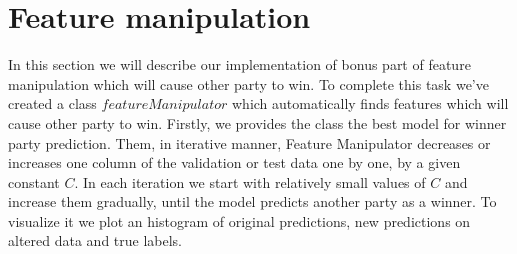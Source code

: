 \documentclass[12pt]{article}
\begin{document}
\newpage
\section{Feature manipulation}
In this section we will describe our implementation of bonus part of feature manipulation which will cause other party to win. To complete this task we've created a class $featureManipulator$ which automatically finds features which will cause other party to win. Firstly, we provides the class the best model for winner party prediction. Them, in iterative manner, Feature Manipulator decreases or increases one column of the validation or test data one by one, by a given constant $C$. In each iteration we start with relatively small values of $C$ and increase them gradually, until the model predicts another party as a winner. To visualize it we plot an histogram of original predictions, new predictions on altered data and true labels.   
\end{document}

